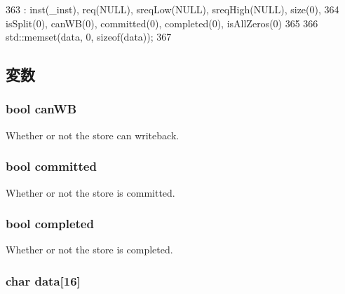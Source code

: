 \begin{DoxyCode}
363             : inst(_inst), req(NULL), sreqLow(NULL), sreqHigh(NULL), size(0),
364               isSplit(0), canWB(0), committed(0), completed(0), isAllZeros(0)
365         {
366             std::memset(data, 0, sizeof(data));
367         }
\end{DoxyCode}


\subsection{変数}
\hypertarget{structLSQUnit_1_1SQEntry_a2e445065a38a8a82256decf088cd3e6d}{
\subsubsection[{canWB}]{\setlength{\rightskip}{0pt plus 5cm}bool {\bf canWB}}}
\label{structLSQUnit_1_1SQEntry_a2e445065a38a8a82256decf088cd3e6d}
Whether or not the store can writeback. \hypertarget{structLSQUnit_1_1SQEntry_a28712f511a3687635fff96e084fdab9a}{
\subsubsection[{committed}]{\setlength{\rightskip}{0pt plus 5cm}bool {\bf committed}}}
\label{structLSQUnit_1_1SQEntry_a28712f511a3687635fff96e084fdab9a}
Whether or not the store is committed. \hypertarget{structLSQUnit_1_1SQEntry_a8c06e370b709d689e392a4b7b53b47c5}{
\subsubsection[{completed}]{\setlength{\rightskip}{0pt plus 5cm}bool {\bf completed}}}
\label{structLSQUnit_1_1SQEntry_a8c06e370b709d689e392a4b7b53b47c5}
Whether or not the store is completed. \hypertarget{structLSQUnit_1_1SQEntry_a4454a49c48ef08781793358f56b7bbc6}{
\subsubsection[{data}]{\setlength{\rightskip}{0pt plus 5cm}char {\bf data}\mbox{[}16\mbox{]}}}
